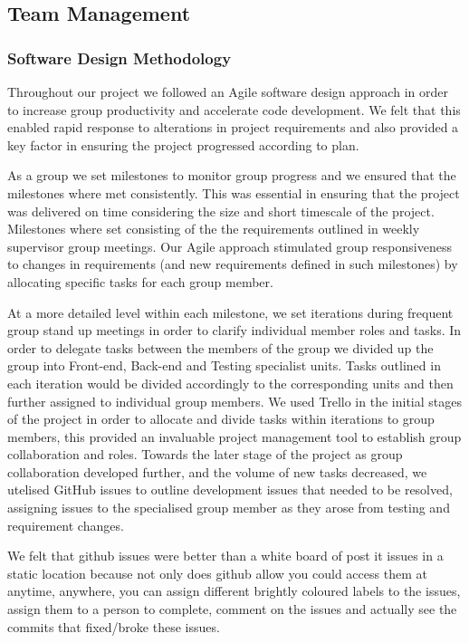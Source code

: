 \subsection{Team Management}
  \subsubsection{Software Design Methodology}
    Throughout our project we followed an Agile software design approach in order to increase group productivity and accelerate code development. We felt that this enabled rapid response to alterations in project requirements and also provided a key factor in ensuring the project progressed according to plan.

    As a group we set milestones to monitor group progress and we ensured that the milestones where met consistently. This was essential in ensuring that the project was delivered on time considering the size and short timescale of the project. Milestones where set consisting of the the requirements outlined in weekly supervisor group meetings. Our Agile approach stimulated group responsiveness to changes in requirements (and new requirements defined in such milestones) by allocating specific tasks for each group member. 

    At a more detailed level within each milestone, we set iterations during frequent group stand up meetings in order to clarify individual member roles and tasks. In order to delegate tasks between the members of the group we divided up the group into Front-end, Back-end and Testing specialist units. Tasks outlined in each iteration would be divided accordingly to the corresponding units and then further assigned to individual group members. We used Trello in the initial stages of the project in order to allocate and divide tasks within iterations to group members, this provided an invaluable project management tool to establish group collaboration and roles. Towards the later stage of the project as group collaboration developed further, and the volume of new tasks decreased, we utelised GitHub\cite{github} issues to outline development issues that needed to be resolved, assigning issues to the specialised group member as they arose from testing and requirement changes.

    We felt that github issues were better than a white board of post it issues in a static location because not only does github allow you could access them at anytime, anywhere, you can assign different brightly coloured labels to the issues, assign them to a person to complete, comment on the issues and actually see the commits that fixed/broke these issues. 


